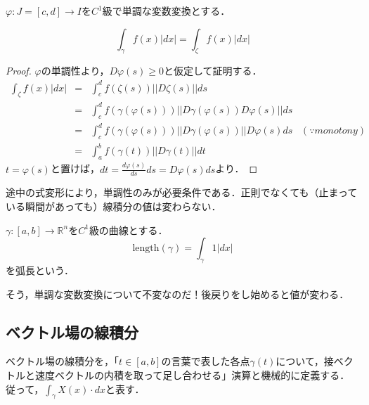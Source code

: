 \documentclass[uplatex, dvipdfmx]{jsreport}
\begin{document}
\begin{proposition}
    $\varphi:J=[c,d]\to I$を$C^1$級で単調な変数変換とする．
    \begin{center}
    \end{center}
    \[ \int_\gamma f(x)|dx|=\int_\zeta f(x)|dx| \]
\end{proposition}
\begin{proof}
    $\varphi$の単調性より，$D\varphi (s)\ge 0$と仮定して証明する．
    \begin{eqnarray*}
        \int_\zeta f(x)|dx| &=& \int^d_c f(\zeta (s))||D\zeta(s)||ds \\
        &=& \int^d_c f(\gamma (\varphi (s))) ||D\gamma (\varphi (s))D\varphi (s)|| ds \\
        &=& \int^d_c f(\gamma (\varphi (s))) ||D\gamma (\varphi (s))||D\varphi (s) ds\;\;\; (\because monotony) \\
        &=& \int^b_a f(\gamma (t))||D\gamma (t)||dt
    \end{eqnarray*}
    $t=\varphi (s)$と置けば，$dt = \frac{d\varphi (s)}{ds}ds = D\varphi (s)ds$より．
\end{proof}
\begin{example}
    途中の式変形により，単調性のみが必要条件である．正則でなくても（止まっている瞬間があっても）線積分の値は変わらない．
\end{example}

\begin{definition}[弧長]
    $\gamma :[a,b]\to\mathbb{R}^n$を$C^1$級の曲線とする．
    \[ \mathrm{length}(\gamma) = \int_\gamma 1|dx| \]
    を弧長という．
\end{definition}
\begin{remark}
    そう，単調な変数変換について不変なのだ！後戻りをし始めると値が変わる．
\end{remark}

\subsection{ベクトル場の線積分}
ベクトル場の線積分を，「$t\in [a,b]$の言葉で表した各点$\gamma(t)$について，接ベクトルと速度ベクトルの内積を取って足し合わせる」演算と機械的に定義する．
従って，$\int_\gamma X(x)\cdot dx$と表す．
\end{document}
